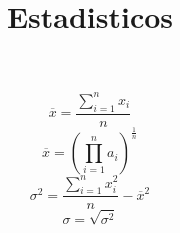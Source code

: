 
\title{Estadisticos}



\begin{equation}
    \overline{x} = \dfrac{\sum\limits_{i=1}^n{x_i}}{n}
\end{equation}
\begin{equation}
    \overline{x} = (\prod\limits_{i=1}^n{a_i})^{\frac{1}{n}}
\end{equation}
\begin{equation}
    \sigma^2 = \dfrac{\sum\limits_{i=1}^n{x^2_i}}{n}-\overline{x}^2
\end{equation}
\begin{equation}
    \sigma = \sqrt{\sigma^2}
\end{equation}
